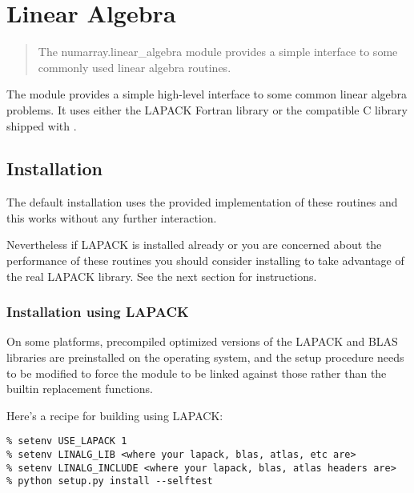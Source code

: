 \chapter{Linear Algebra}
\label{cha:linear-algebra}

\makeatletter
\py@reset
\makeatother

\begin{quote}
  The numarray.linear\_algebra module provides a simple interface to some
  commonly used linear algebra routines.
\end{quote}

The  module provides a simple high-level
interface to some common linear algebra problems. It uses either the LAPACK
Fortran library or the compatible
 C library shipped with
.

\section{Installation}
\label{sec:LA:installation}

The default installation uses the provided
 implementation of these routines
and this works without any further interaction.

Nevertheless if LAPACK is installed already or you are concerned about the
performance of these routines you should consider installing
 to take advantage of the real LAPACK library.
See the next section for instructions.

\subsection{Installation using LAPACK}
\label{sec:LA:install-lapack}

On some platforms, precompiled optimized versions of the LAPACK and BLAS
libraries are preinstalled on the operating system, and the setup procedure
needs to be modified to force the  module to be linked
against those rather than the builtin replacement functions.

Here's a recipe for building using LAPACK:

\begin{verbatim}
% setenv USE_LAPACK 1
% setenv LINALG_LIB <where your lapack, blas, atlas, etc are>
% setenv LINALG_INCLUDE <where your lapack, blas, atlas headers are>
% python setup.py install --selftest
\end{verbatim}

